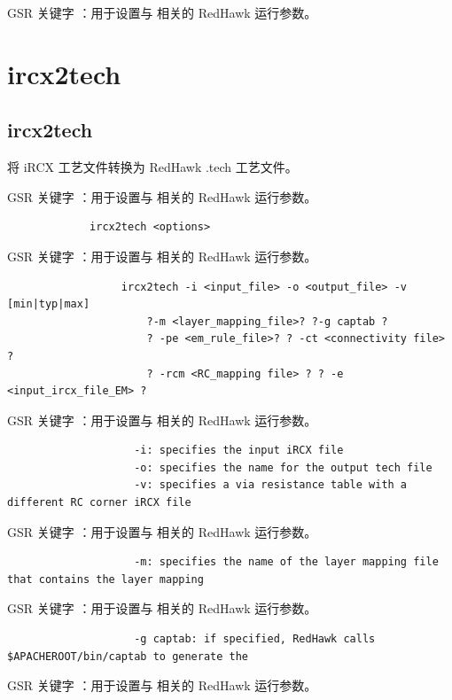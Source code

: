 GSR 关键字 ：用于设置与  相关的 RedHawk 运行参数。

\section{ircx2tech}
\subsection*{ircx2tech}

将 iRCX 工艺文件转换为 RedHawk .tech 工艺文件。

GSR 关键字 ：用于设置与  相关的 RedHawk 运行参数。

\begin{lstlisting}
             ircx2tech <options>
\end{lstlisting}

GSR 关键字 ：用于设置与  相关的 RedHawk 运行参数。

\begin{lstlisting}
                  ircx2tech -i <input_file> -o <output_file> -v [min|typ|max]
                      ?-m <layer_mapping_file>? ?-g captab ?
                      ? -pe <em_rule_file>? ? -ct <connectivity file> ?
                      ? -rcm <RC_mapping file> ? ? -e <input_ircx_file_EM> ?
\end{lstlisting}

GSR 关键字 ：用于设置与  相关的 RedHawk 运行参数。

\begin{lstlisting}
                    -i: specifies the input iRCX file
                    -o: specifies the name for the output tech file
                    -v: specifies a via resistance table with a different RC corner iRCX file
\end{lstlisting}

GSR 关键字 ：用于设置与  相关的 RedHawk 运行参数。

\begin{lstlisting}
                    -m: specifies the name of the layer mapping file that contains the layer mapping
\end{lstlisting}

GSR 关键字 ：用于设置与  相关的 RedHawk 运行参数。

\begin{lstlisting}
                    -g captab: if specified, RedHawk calls $APACHEROOT/bin/captab to generate the
\end{lstlisting}

GSR 关键字 ：用于设置与  相关的 RedHawk 运行参数。

